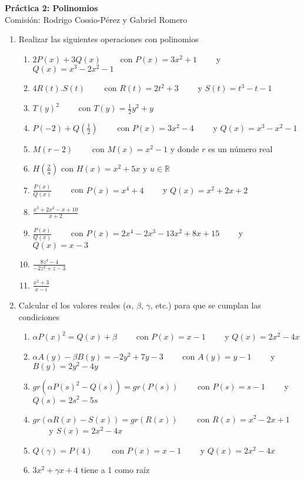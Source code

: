 \documentclass[a4paper]{article}
\newcommand{\exercise}{\item}
\newcommand{\df}[2]{\displaystyle\frac{#1}{#2}}
\begin{document}
\noindent \hrulefill 
\vspace{-7pt}
\begin{center} 
	\textbf{ Práctica 2: Polinomios } \\
	Comisión: Rodrigo Cossio-Pérez y Gabriel Romero
\end{center}
\vspace{-10pt}
\hrulefill
\begin{enumerate}
	\exercise Realizar las siguientes operaciones con polinomios
	\begin{enumerate} [label=(\alph*)]
		\item $2P(x)+3Q(x)$ ~~~~con $P(x)=3x^2+1$ ~~~~y $Q(x)=x^3-2x^2-1$
		\item $4R(t).S(t)$ ~~~~con $R(t)=2t^2+3$ ~~~~y $S(t)=t^3-t-1$
		\item $T(y)^2$ ~~~~con $T(y)=\df{1}{2}y^2+y$
		\item $P(-2)+Q\left(\df{1}{2}\right)$ ~~~~con $P(x)=3x^2-4$ ~~~~y $Q(x)=x^3-x^2-1$
		\item $M(r-2)$ ~~~~con $M(x)=x^2-1$ y donde $r$ es un número real
		\item $H\left(\df{2}{u}\right)$ con $H(x)=x^2+5x$ y $u \in \mathbb{R}$
		\item $\df{P(x)}{Q(x)}$ ~~~~con $P(x)=x^4+4$ ~~~~y $Q(x)=x^2+2x+2$
		\item $\df{x^3+2x^2-x+10}{x+2}$
		\item $\df{P(x)}{Q(x)}$ ~~~~con $P(x)=2x^4-2x^3-13x^2+8x+15$ ~~~~y $Q(x)=x-3$
		\item $\df{8z^4-4}{-2z^2+z-3}$
		\item $\df{x^2+3}{x-i}$
	\end{enumerate}
	\exercise Calcular el los valores reales ($\alpha$, $\beta$, $\gamma$, etc.) para que se cumplan las condiciones
	\begin{enumerate} [label=(\alph*)]
		\item $\alpha P(x)^2 = Q(x) +\beta$ ~~~~con $P(x)=x-1$ ~~~~y $Q(x)=2x^2-4x$
		\item $\alpha A(y)-\beta B(y) = -2y^2 +7y-3$ ~~~~con $A(y)=y-1$ ~~~~y $B(y)=2y^2-4y$
		\item $gr\left(\alpha P(s)^2 - Q(s)\right)=gr\left(P(s)\right)$ ~~~~con $P(s)=s-1$ ~~~~y $Q(s)=2s^2-5s$
		\item $gr\left(\alpha R(x) - S(x)\right)=gr\left(R(x)\right)$ ~~~~con $R(x)=x^2-2x+1$ ~~~~y $S(x)=2x^2-4x$
		\item $Q(\gamma)=P(4)$ ~~~~con $P(x)=x-1$ ~~~~y $Q(x)=2x^2-4x$
		\item $3x^2+\gamma x+4$ tiene a 1 como raíz

\end{enumerate}
\end{enumerate}
\end{document}
